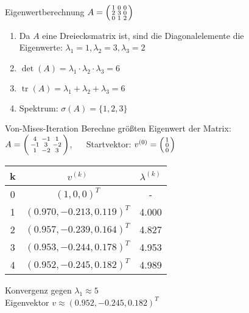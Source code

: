 \begin{example2}{Eigenwertberechnung}
$A = \begin{psmallmatrix} 1 & 0 & 0\\ 2 & 3 & 0\\ 0 & 1 & 2\end{psmallmatrix}$
\begin{enumerate}
    \item Da $A$ eine Dreiecksmatrix ist, sind die Diagonalelemente die \\
    Eigenwerte:
    $\lambda_1 = 1, \lambda_2 = 3, \lambda_3 = 2$
    \item $\det(A) = \lambda_1\cdot\lambda_2\cdot\lambda_3 = 6$
    \item $\operatorname{tr}(A) = \lambda_1 + \lambda_2 + \lambda_3 = 6$
    \item Spektrum: $\sigma(A) = \{1,2,3\}$
\end{enumerate}
\end{example2}

\begin{example2}{Von-Mises-Iteration}
Berechne größten Eigenwert der Matrix:
\vspace{2mm}\\
$A = \begin{psmallmatrix}
4 & -1 & 1\\
-1 & 3 & -2\\
1 & -2 & 3
\end{psmallmatrix}$, $\quad$
Startvektor: $v^{(0)} = \begin{psmallmatrix}1\\ 0\\ 0\end{psmallmatrix}$

\begin{center}
\begin{tabular}{c|c|c}
k & $v^{(k)}$ & $\lambda^{(k)}$ \\\hline
0 & $(1, 0, 0)^T$ & -\\
1 & $(0.970, -0.213, 0.119)^T$ & 4.000\\
2 & $(0.957, -0.239, 0.164)^T$ & 4.827\\
3 & $(0.953, -0.244, 0.178)^T$ & 4.953\\
4 & $(0.952, -0.245, 0.182)^T$ & 4.989
\end{tabular}
\end{center}

Konvergenz gegen $\lambda_1 \approx 5$ \\ Eigenvektor $v \approx (0.952, -0.245, 0.182)^T$
\end{example2}

